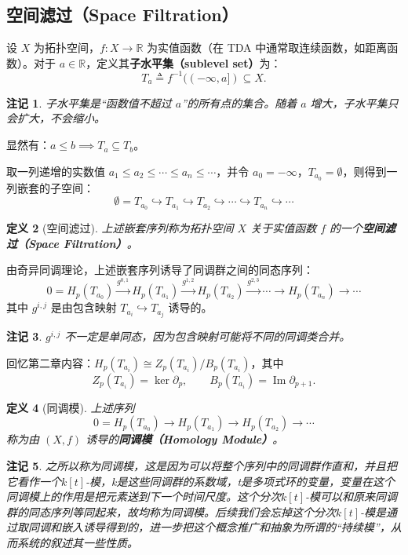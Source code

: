\documentclass[UTF8]{ctexart}
\newtheorem{definition}{定义}[section]
\newtheorem{remark}[definition]{注记}
\begin{document}
\subsection{空间滤过（Space Filtration）}
\label{subsec:space-filtration}

设 \(X\) 为拓扑空间，\(f: X \to \mathbb{R}\) 为实值函数（在 TDA 中通常取连续函数，如距离函数）。对于 \(a \in \mathbb{R}\)，定义其\textbf{子水平集（sublevel set）}为：
\[
T_a \triangleq f^{-1}((-\infty, a]) \subseteq X.
\]

\begin{remark}
子水平集是“函数值不超过 \(a\)”的所有点的集合。随着 \(a\) 增大，子水平集只会扩大，不会缩小。
\end{remark}

显然有：\(a \leq b \implies T_a \subseteq T_b\)。

取一列递增的实数值 \(a_1 \leq a_2 \leq \cdots \leq a_n \leq \cdots\)，并令 \(a_0 = -\infty\)，\(T_{a_0} = \emptyset\)，则得到一列嵌套的子空间：
\[
\emptyset = T_{a_0} \hookrightarrow T_{a_1} \hookrightarrow T_{a_2} \hookrightarrow \cdots \hookrightarrow T_{a_n} \hookrightarrow \cdots
\]

\begin{definition}[空间滤过]
\label{def:space-filtration}
上述嵌套序列称为拓扑空间 \(X\) 关于实值函数 \(f\) 的一个\textbf{空间滤过（Space Filtration）}。
\end{definition}

由奇异同调理论，上述嵌套序列诱导了同调群之间的同态序列：
\[
0 = H_p(T_{a_0}) \xrightarrow{g^{0,1}} H_p(T_{a_1}) \xrightarrow{g^{1,2}} H_p(T_{a_2}) \xrightarrow{g^{2,3}} \cdots \xrightarrow{} H_p(T_{a_n}) \xrightarrow{} \cdots
\]
其中 \(g^{i,j}\) 是由包含映射 \(T_{a_i} \hookrightarrow T_{a_j}\) 诱导的。

\begin{remark}
\(g^{i,j}\) 不一定是单同态，因为包含映射可能将不同的同调类合并。
\end{remark}

回忆第二章内容：\(H_p(T_{a_i}) \cong Z_p(T_{a_i}) / B_p(T_{a_i})\)，其中
\[
Z_p(T_{a_i}) = \ker \partial_p, \qquad B_p(T_{a_i}) = \operatorname{Im} \partial_{p+1}.
\]

\begin{definition}[同调模]
\label{def:homology-module-sequence}
上述序列
\[
0 = H_p(T_{a_0}) \to H_p(T_{a_1}) \to H_p(T_{a_2}) \to \cdots
\]
称为由 \((X, f)\) 诱导的\textbf{同调模（Homology Module）}。
\end{definition}
\begin{remark}
之所以称为同调模，这是因为可以将整个序列中的同调群作直和，并且把它看作一个$k[t]$-模，k是这些同调群的系数域，t是多项式环的变量，变量在这个同调模上的作用是把元素送到下一个时间尺度。这个分次$k[t]$-模可以和原来同调群的同态序列等同起来，故均称为同调模。后续我们会忘掉这个分次$k[t]$-模是通过取同调和嵌入诱导得到的，进一步把这个概念推广和抽象为所谓的“持续模”，从而系统的叙述其一些性质。
\end{remark}
\end{document}
